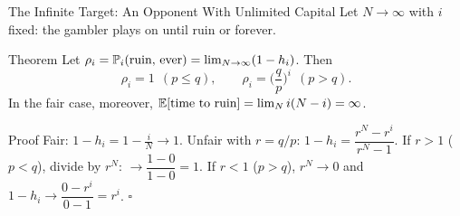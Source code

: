 \begin{frame}{The Infinite Target: An Opponent With Unlimited Capital}
  \label{fr:infinite}
  \small
  Let $N\to\infty$ with $i$ fixed: the gambler plays on until ruin or forever.
  \begin{block}{Theorem}
    Let $\rho_i=\mathbb{P}_i(\text{ruin, ever})=\lim_{N\to\infty}(1-h_i)$. Then
    \[
      \rho_i=1\ \ (p\le q),\qquad \rho_i=\Big(\frac qp\Big)^{i}\ \ (p>q).
    \]
    In the fair case, moreover, $\mathbb{E}[\text{time to ruin}]=\lim_N i(N-i)=\infty$.
  \end{block}
  \begin{block}{Proof}
    Fair: $1-h_i=1-\tfrac iN\to1$. Unfair with $r=q/p$: $1-h_i=\dfrac{r^N-r^i}{r^N-1}$. If $r>1$ ($p<q$), divide by $r^N$: $\to\dfrac{1-0}{1-0}=1$. If $r<1$ ($p>q$), $r^N\to0$ and $1-h_i\to\dfrac{0-r^i}{0-1}=r^i$. \hfill$\square$
  \end{block}
\end{frame}

